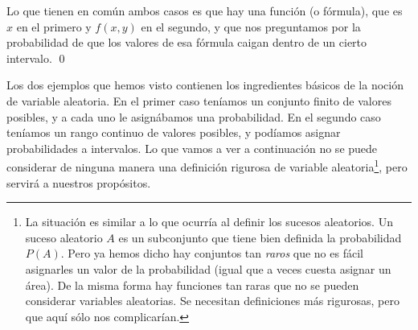 \begin{itemize}
\begin{Ejemplo}
        Lo que tienen en común ambos casos es que hay una función (o fórmula), que es $x$ en el primero y $f(x,y)$ en el segundo, y que nos preguntamos por la probabilidad de que los valores de esa fórmula caigan dentro de un cierto intervalo.
        \qed
        \end{Ejemplo}
        Los dos ejemplos que hemos visto contienen los ingredientes básicos de la noción de variable aleatoria. En el primer caso teníamos un conjunto finito de valores posibles, y a cada uno le asignábamos una probabilidad. En el segundo caso teníamos un rango continuo de valores posibles, y podíamos asignar probabilidades a intervalos. Lo que vamos a ver a continuación no se puede considerar de ninguna manera una definición rigurosa de variable aleatoria\footnote{La situación es similar a lo que ocurría al definir los sucesos aleatorios. Un suceso aleatorio $A$ es un subconjunto que tiene bien definida la probabilidad $P(A)$. Pero ya hemos dicho hay conjuntos tan {\em raros} que no es fácil asignarles un valor de la probabilidad (igual que a veces cuesta asignar un área). De la misma forma hay funciones tan raras que no se pueden considerar variables aleatorias. Se necesitan definiciones más rigurosas, pero que aquí sólo nos complicarían.}, pero servirá a nuestros propósitos.\\[3mm]
\end{itemize}
